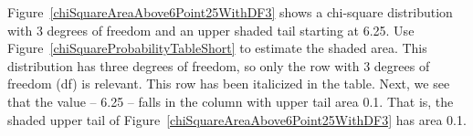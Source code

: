 \begin{examplewrap}
\begin{nexample}{Figure~\ref{chiSquareAreaAbove6Point25WithDF3} shows a chi-square distribution with 3 degrees of freedom and an upper shaded tail starting at 6.25. Use Figure~\ref{chiSquareProbabilityTableShort} to estimate the shaded area.}
This distribution has three degrees of freedom, so only the row with 3 degrees of freedom (df) is relevant. This row has been italicized in the table. Next, we see that the value -- 6.25 -- falls in the column with upper tail area 0.1. That is, the shaded upper tail of Figure~\ref{chiSquareAreaAbove6Point25WithDF3} has area 0.1.
\end{nexample}
\end{examplewrap}

\begin{figure}
\centering
{}
\end{figure}

